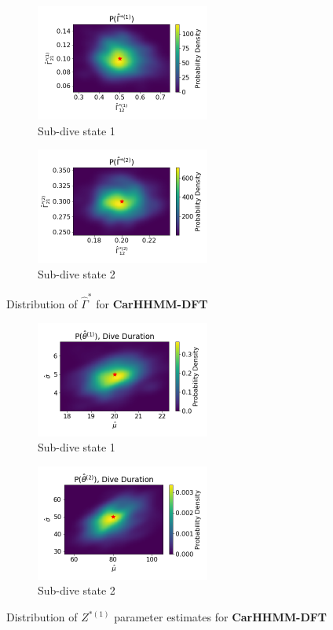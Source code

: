 \documentclass[12pt]{TD-CJS}
\begin{document}
\begin{figure}[ht]
	\centering
	\begin{subfigure}[t]{0.45\textwidth}
        \centering
        \includegraphics[width=2.25in]{../Plots/hhmm_FV_Gamma_density_0.png}
        \caption{Sub-dive state 1}
    \end{subfigure}
    \begin{subfigure}[t]{0.45\textwidth}
        \centering
        \includegraphics[width=2.25in]{../Plots/hhmm_FV_Gamma_density_1.png}
        \caption{Sub-dive state 2}
    \end{subfigure}
    \caption{Distribution of $\hat \Gamma^{*}$ for \textbf{CarHHMM-DFT}}
\end{figure}

\begin{figure}[ht]
	\centering
	\begin{subfigure}[t]{0.45\textwidth}
        \centering
        \includegraphics[width=2.25in]{../Plots/hhmm_FV_MLE_density_dive_duration_-1_0.png}
        \caption{Sub-dive state 1}
    \end{subfigure}
    \begin{subfigure}[t]{0.45\textwidth}
        \centering
        \includegraphics[width=2.25in]{../Plots/hhmm_FV_MLE_density_dive_duration_-1_1.png}
        \caption{Sub-dive state 2}
    \end{subfigure}
    \caption{Distribution of $Z^{*(1)}$ parameter estimates for \textbf{CarHHMM-DFT}}
\end{figure}
\end{document}
